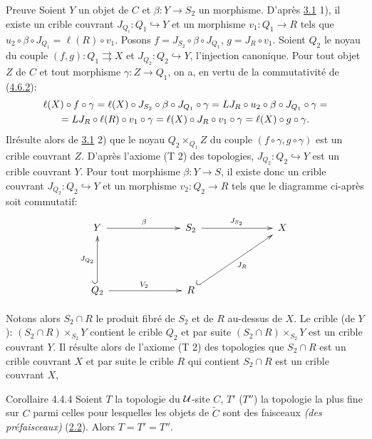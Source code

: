 \documentclass[10pt]{../fichiers-configuration-latex/smfart}
\begin{document}
\begin{enonce*}[remark]{Preuve}
Soient $Y$ un objet de $C$ et $\beta:Y\rightarrow S_2$ un morphisme.
D'après \hyperref[II.lem3.1]{3.1} 1), il existe un crible couvrant
$J_{Q_i}:Q_1\hookrightarrow Y$ et un morphisme $v_1:Q_1\rightarrow
R$ tels que $u_2\circ\beta\circ J_{Q_1}=\ell(R)\circ v_1$. Posons
$f=J_{S_{2}}\circ \beta\circ J_{Q_1}$, $g=J_R\circ v_1$. Soient
$Q_2$ le noyau du couple $(f,g):Q_1\rightrightarrows X$ et
$J_{Q_2}:Q_2\hookrightarrow Y$, l'injection canonique. Pour tout
objet $Z$ de $C$ et tout morphisme $\gamma:Z\rightarrow Q_1$, on a,
en vertu de la commutativité de (\hyperref[II.eq4.6.2]{4.6.2}):
\begin{gather*}
\ell(X)\circ f\circ \gamma =\ell(X)\circ J_{S_2}\circ \beta\circ
J_{Q_1}\circ \gamma =LJ_R\circ u_2\circ \beta\circ J_{Q_1}\circ \gamma=\\
=LJ_R\circ \ell(R)\circ v_1\circ \gamma =\ell (X)\circ J_R\circ
v_1\circ \gamma = \ell(X)\circ g\circ \gamma{}.
\end{gather*}
Il\pageoriginale résulte alors de \hyperref[II.lem3.1]{3.1} 2) que le noyau
$Q_2\times_{Q_1}Z$ du couple $(f\circ\gamma, g\circ\gamma)$ est un
crible couvrant $Z$. D'après l'axiome (T 2) des topologies,
$J_{Q_2}:Q_2\hookrightarrow Y$ est un crible couvrant $Y$. Pour tout
morphisme $\beta:Y\rightarrow S$, il existe donc un crible couvrant
$J_{Q_2}:Q_2\hookrightarrow Y$ et un morphisme $v_2:Q_2\rightarrow
R$ tels que le diagramme ci-après soit commutatif:
\[
\xymatrix@C=2.5cm@R=1.5cm@M=.2cm{
Y\ar[r]^{\beta}   & S_2\ar[r]^{J_{S_2}} & X\\
Q_2 \ar[r]^{V_2} \ar@{^{(}->}[u]^{J_{Q_2}}& R
\ar@{^{(}->}[ru]_{J_{R}}  &}
\]

Notons alors $S_2\cap R$ le produit fibré de $S_2$ et de $R$
au-dessus de $X$. Le crible (de $Y$): $(S_2\cap R)\times_{S_2}Y$
contient le crible $Q_2$ et par suite $(S_2\cap R)\times_{S_2}Y$ est
un crible couvrant $Y$. Il résulte alors de l'axiome (T 2) des
topologies que $S_2\cap R$ est un crible couvrant $X$ et par suite
le crible $R$ qui contient $S_2\cap R$ est un crible couvrant $X$,
\cqfd
\end{enonce*}

\setcounter{subsubsection}{3}
\begin{enonce*}{Corollaire 4.4.4}
Soient $T$ la topologie du ${\mathcal U}$-site $C$, $T'$ (\resp $T''$) la
topologie la plus fine sur $C$ parmi celles pour lesquelles les
objets de $\widetilde{C}$ sont des faisceaux \emph{(\resp des
préfaisceaux)} (\hyperref[II.prop2.2]{2.2}). Alors $T=T'=T''$.
\end{enonce*}
\end{document}
